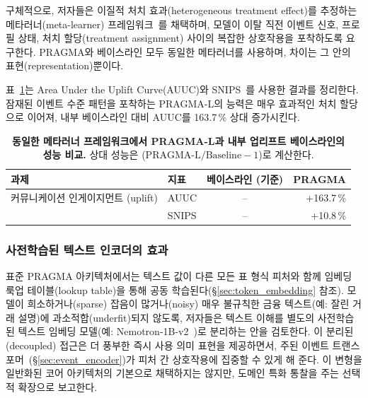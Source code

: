 구체적으로, 저자들은 이질적 처치 효과(heterogeneous treatment effect)를 추정하는 메타러너(meta-learner) 프레임워크~\citep{kunzel2019metalearners}를 채택하며, 모델이 이탈 직전 이벤트 신호, 프로필 상태, 처치 할당(treatment assignment) 사이의 복잡한 상호작용을 포착하도록 요구한다.
PRAGMA와 베이스라인 모두 동일한 메타러너를 사용하며, 차이는 그 안의 표현(representation)뿐이다.

표~\ref{tab:uplift_results}는 Area Under the Uplift Curve(AUUC)와 SNIPS~\citep{swaminathan2015self}를 사용한 결과를 정리한다.
잠재된 이벤트 수준 패턴을 포착하는 PRAGMA-L의 능력은 매우 효과적인 처치 할당으로 이어져, 내부 베이스라인 대비 AUUC를 163.7\,\% 상대 증가시킨다.

\begin{table}[t]
\centering
\begin{tabular}{llcr}
\textbf{과제}               & \textbf{지표}   & \textbf{베이스라인 (기준)} & \textbf{PRAGMA} \\
\midrule
커뮤니케이션 인게이지먼트 (uplift) & AUUC       & --                     & +163.7\,\%                \\
                           & SNIPS             & --                     &  +10.8\,\%                \\
\end{tabular}
\caption{
    \textbf{동일한 메타러너 프레임워크에서 PRAGMA-L과 내부 업리프트 베이스라인의 성능 비교.}
    상대 성능은 ($\text{PRAGMA-L} / \text{Baseline} - 1$)로 계산한다.
    }
    \label{tab:uplift_results}
\end{table}

\subsubsection{사전학습된 텍스트 인코더의 효과}
\label{sec:external_embeddings}

표준 PRAGMA 아키텍처에서는 텍스트 값이 다른 모든 표 형식 피처와 함께 임베딩 룩업 테이블(lookup table)을 통해 공동 학습된다(\S\ref{sec:token_embedding} 참조).
모델이 희소하거나(sparse) 잡음이 많거나(noisy) 매우 불규칙한 금융 텍스트(예: 잘린 거래 설명)에 과소적합(underfit)되지 않도록, 저자들은 텍스트 이해를 별도의 사전학습된 텍스트 임베딩 모델(예: Nemotron-1B-v2~\citep{moreira2024nvretriever})로 분리하는 안을 검토한다.
이 분리된(decoupled) 접근은 더 풍부한 즉시 사용 의미 표현을 제공하면서, 주된 이벤트 트랜스포머~(\S\ref{sec:event_encoder})가 피처 간 상호작용에 집중할 수 있게 해 준다.
이 변형을 일반화된 코어 아키텍처의 기본으로 채택하지는 않지만, 도메인 특화 통찰을 주는 선택적 확장으로 보고한다.

